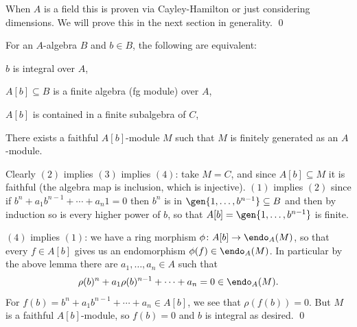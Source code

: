 \elemm

\bproof

    When $A$ is a field this is proven via Cayley-Hamilton or just considering dimensions.
    We will prove this in the next section in generality.
    \qed

\eproof

\bprop

    For an $A$-algebra $B$ and $b\in B$, the following are equivalent:
    \benum
        \item $b$ is integral over $A$,
        \item $A[b]\subseteq B$ is a finite algebra (fg module) over $A$,
        \item $A[b]$ is contained in a finite subalgebra of $C$,
        \item There exists a faithful $A[b]$-module $M$ such that $M$ is finitely generated as an $A$-module.
    \eenum

\eprop

\bproof

    Clearly $(2)$ implies $(3)$ implies $(4)$: take $M=C$, and since $A[b]\subseteq M$ it is faithful (the algebra map is inclusion, which is
    injective).
    $(1)$ implies $(2)$ since if $b^n+a_1b^{n-1}+\cdots+a_n1=0$ then $b^n$ is in $\gen{1,\dots,b^{n-1}}\subseteq B$ and then by induction so is
    every higher power of $b$, so that $A[b]=\gen{1,\dots,b^{n-1}}$ is finite.

    $(4)$ implies $(1)$: we have a ring morphism $\phi\colon A[b]\to\endo_A(M)$, so that every $f\in A[b]$ gives us an endomorphism
    $\phi(f)\in\endo_A(M)$.
    In particular by the above lemma there are $a_1,\dots,a_n\in A$ such that
    $$ \rho(b)^n + a_1\rho(b)^{n-1} + \cdots + a_n = 0 \in \endo_A(M) . $$
    For $f(b)=b^n+a_1b^{n-1}+\cdots+a_n\in A[b]$, we see that $\rho(f(b))=0$.
    But $M$ is a faithful $A[b]$-module, so $f(b)=0$ and $b$ is integral as desired.
    \qed

\eproof

